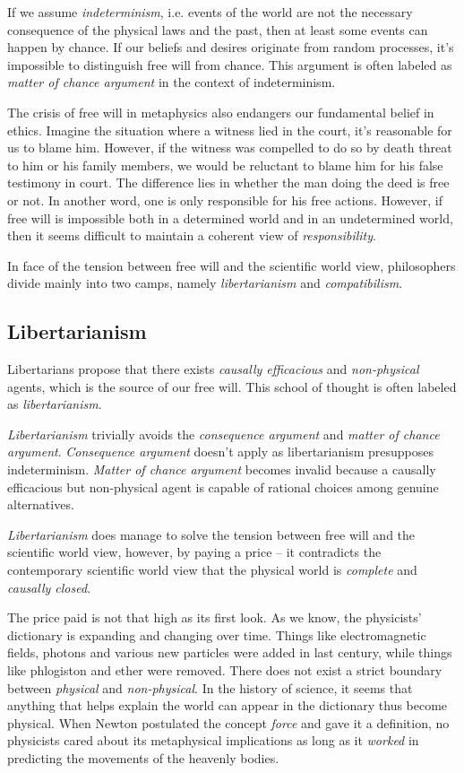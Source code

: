If we assume \emph{indeterminism}, i.e. events of the world are not the necessary consequence of the physical laws and the past, then at least some events can happen by chance. If our beliefs and desires originate from random processes, it’s impossible to distinguish free will from chance. This argument is often labeled as \emph{matter of chance argument} in the context of indeterminism.

The crisis of free will in metaphysics also endangers our fundamental belief in ethics. Imagine the situation where a witness lied in the court, it's reasonable for us to blame him. However, if the witness was compelled to do so by death threat to him or his family members, we would be reluctant to blame him for his false testimony in court. The difference lies in whether the man doing the deed is free or not. In another word, one is only responsible for his free actions. However, if free will is impossible both in a determined world and in an undetermined world, then it seems difficult to maintain a coherent view of \emph{responsibility}.

In face of the tension between free will and the scientific world view, philosophers divide mainly into two camps, namely \emph{libertarianism} and \emph{compatibilism}.

\subsection{Libertarianism}

Libertarians propose that there exists \emph{causally efficacious} and \emph{non-physical} agents, which is the source of our free will. This school of thought is often labeled as \emph{libertarianism}.

\emph{Libertarianism} trivially avoids the \emph{consequence argument} and \emph{matter of chance argument}. \emph{Consequence argument} doesn't apply as libertarianism presupposes indeterminism. \emph{Matter of chance argument} becomes invalid because a causally efficacious but non-physical agent is capable of rational choices among genuine alternatives.

\emph{Libertarianism} does manage to solve the tension between free will and the scientific world view, however, by paying a price -- it contradicts the contemporary scientific world view that the physical world is \emph{complete} and \emph{causally closed}.

The price paid is not that high as its first look. As we know, the physicists' dictionary is expanding and changing over time. Things like electromagnetic fields, photons and various new particles were added in last century, while things like phlogiston and ether were removed. There does not exist a strict boundary between \emph{physical} and \emph{non-physical}. In the history of science, it seems that anything that helps explain the world can appear in the dictionary thus become physical. When Newton postulated the concept \emph{force} and gave it a definition, no physicists cared about its metaphysical implications as long as it \emph{worked} in predicting the movements of the heavenly bodies.

